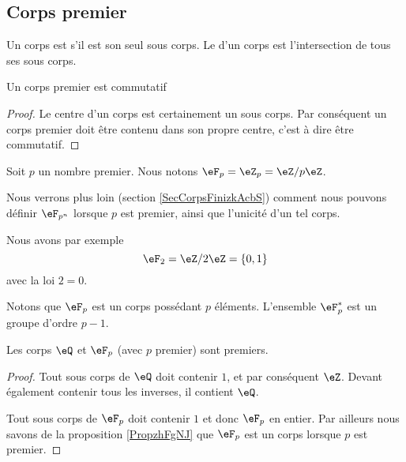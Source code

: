 \subsection{Corps premier}
\label{subseccorpspremhBlYIv}

\begin{definition}
    Un corps est  s'il est son seul sous corps. Le  d'un corps est l'intersection de tous ses sous corps.
\end{definition}

\begin{lemma}
    Un corps premier est commutatif
\end{lemma}

\begin{proof}
    Le centre d'un corps est certainement un sous corps. Par conséquent un corps premier doit être contenu dans son propre centre, c'est à dire être commutatif.
\end{proof}

\begin{definition}  \label{DefXIHLooBAcqYH}
Soit \( p\) un nombre premier. Nous notons \( \eF_p=\eZ_p=\eZ/p\eZ\). 
\end{definition}

Nous verrons plus loin (section \ref{SecCorpsFinizkAcbS}) comment nous pouvons définir \( \eF_{p^n}\) lorsque \( p\) est premier, ainsi que l'unicité d'un tel corps.

Nous avons par exemple 
\begin{equation}
    \eF_2=\eZ/2\eZ=\{ 0,1 \}
\end{equation}
avec la loi \( 2=0\).

Notons que \( \eF_p\) est un corps possédant \( p\) éléments. L'ensemble \( \eF_p^*\) est un groupe d'ordre \( p-1\).

\begin{lemma}
    Les corps \( \eQ\) et \( \eF_p\) (avec \( p\) premier) sont premiers.
\end{lemma}

\begin{proof}
    Tout sous corps de \( \eQ\) doit contenir \( 1\), et par conséquent \( \eZ\). Devant également contenir tous les inverses, il contient \( \eQ\).

    Tout sous corps de \(\eF_p \) doit contenir \( 1\) et donc \( \eF_p\) en entier. Par ailleurs nous savons de la proposition \ref{PropzhFgNJ} que \( \eF_p\) est un corps lorsque \( p\) est premier.
\end{proof}


